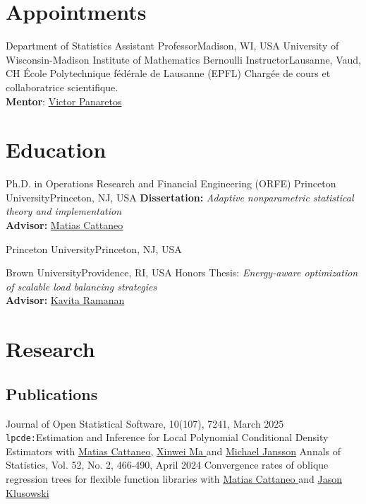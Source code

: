 \documentclass[10pt,a4paper,roman]{moderncv}        %
\begin{document}
\makecvtitle

\vspace{-1cm}
\section{Appointments}
{Department of Statistics}
{Assistant Professor}{Madison, WI, USA}
{University of Wisconsin-Madison}
{}
{Institute of Mathematics}
{Bernoulli Instructor}{Lausanne, Vaud, CH}
{École Polytechnique fédérale de Lausanne (EPFL)}
{Charg\'ee de cours et collaboratrice scientifique.\\
  \textbf{Mentor}: \color{blue}\href{https://people.epfl.ch/victor.panaretos}{Victor Panaretos}}
\vspace{-0.3cm}
\section{Education}
{Ph.D. in Operations Research and Financial Engineering (ORFE)}
{Princeton University}{Princeton, NJ, USA}{}
{\textbf{Dissertation:} \textit{Adaptive nonparametric statistical theory and implementation}
  \\
  \textbf{Advisor: }\color{blue}\href{https://mdcattaneo.github.io}{Matias Cattaneo}\color{black}}

{Princeton University}{Princeton, NJ, USA}{}{}

{Brown University}{Providence, RI, USA}{}{ Honors Thesis: \textit{Energy-aware optimization of scalable load balancing
    strategies}
  \\
  \textbf{Advisor:}
  \color{blue}\href{https://www.brown.edu/academics/applied-mathematics/faculty/kavita-ramanan/home}
  {Kavita Ramanan}\color{black}}  %

\vspace{-0.3cm}
\section{Research}
\subsection{Publications}
\cventry{}
{Journal of Open Statistical Software, 10(107), 7241, March 2025}
{\texttt{lpcde:}Estimation and Inference for Local Polynomial Conditional Density Estimators}
{}
{}
{with \color{blue}\href{https://mdcattaneo.github.io}{Matias Cattaneo}\color{black},
  \color{blue}\href{https://sites.google.com/view/xinweima/home?authuser=0}{Xinwei
    Ma }\color{black}
  and
  \color{blue}\href{https://sites.google.com/berkeley.edu/michael-jansson/}{Michael
    Jansson}\color{black}
}
\cventry{}
{Annals of Statistics, Vol. 52, No. 2, 466-490, April 2024}
{Convergence rates of oblique regression trees for flexible function libraries}
{}
{}
{with
  \color{blue}\href{https://mdcattaneo.github.io}{Matias Cattaneo }\color{black} and
  \color{blue}\href{https://klusowski.princeton.edu}{Jason Klusowski}}
\end{document}
